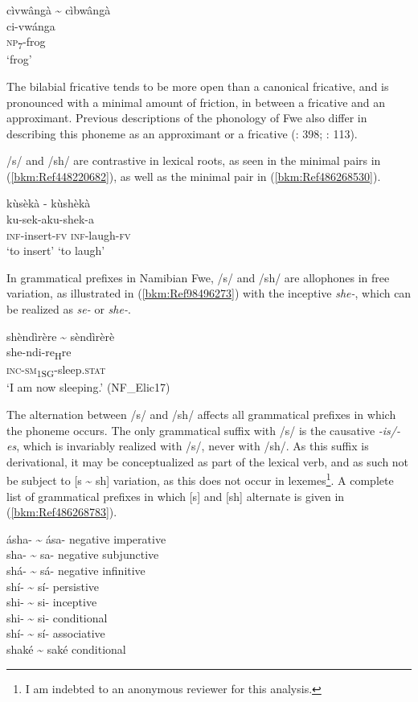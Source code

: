 \ea
\label{bkm:Ref98923767}
cìvwângà {\textasciitilde} cìbwângà\\
\gll ci-vwánga\\
\textsc{np}\textsubscript{7}-frog\\
\glt ‘frog’
\z

The bilabial fricative tends to be more open than a canonical fricative, and is pronounced with a minimal amount of friction, in between a fricative and an approximant. Previous descrip\-tions of the phonology of Fwe also differ in describing this phoneme as an approximant \citep[228]{Seidel2005} or a fricative (\citealt{Baumbach1997}: 398; \citealt{Bostoen2009}: 113).

/s/ and /sh/ are contrastive in lexical roots, as seen in the minimal pairs in (\ref{bkm:Ref448220682}), as well as the minimal pair in (\ref{bkm:Ref486268530}).

\ea
\label{bkm:Ref486268530}
kùsèkà \tab    - \tab  kùshèkà\\
ku-sek-a\tab\tab      ku-shek-a\\
\textsc{inf}-insert-\textsc{fv} \tab\tab   \textsc{inf}-laugh-\textsc{fv}\\
‘to insert’   \tab\tab   ‘to laugh’
\z

In grammatical prefixes in Namibian Fwe, /s/ and /sh/ are allo\-phones in free variation, as illustrated in (\ref{bkm:Ref98496273}) with the inceptive \textit{she-}, which can be realized as \textit{se-} or \textit{she-}.

\ea
\label{bkm:Ref98496273}
shèndìrère {\textasciitilde} sèndìrèrè\\
\gll she-ndi-re\textsubscript{H}re\\
\textsc{inc}-\textsc{sm}\textsubscript{1SG}-sleep.\textsc{stat}\\
\glt ‘I am now sleeping.’ (NF\_Elic17)
\z

The alternation between /s/ and /sh/ affects all grammatical prefixes in which the phoneme oc\-curs. The only grammatical suffix with /s/ is the causative \textit{\nobreakdash-is/\nobreakdash-es}, which is invariably realized with /s/, never with /sh/. As this suffix is derivational, it may be conceptualized as part of the lexical verb, and as such not be subject to [s {\textasciitilde} sh] variation, as this does not occur in lexemes\footnote{I am indebted to an anonymous reviewer for this analysis.}. A complete list of grammatical prefixes in which [s] and [sh] alter\-nate is given in (\ref{bkm:Ref486268783}).

\ea
\label{bkm:Ref486268783}
ásha- {\textasciitilde} ása-     negative imperative\\
sha- {\textasciitilde} sa-    negative subjunctive\\
shá- {\textasciitilde} sá-    negative infinitive\\
shí- {\textasciitilde} sí-    persistive\\
shi- {\textasciitilde} si-    inceptive\\
shi- {\textasciitilde} si-     conditional\\
shí- {\textasciitilde} sí-    associative\\
shaké {\textasciitilde} saké    conditional
\z

